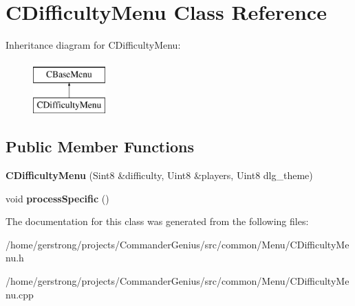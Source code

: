 \hypertarget{class_c_difficulty_menu}{
\section{CDifficultyMenu Class Reference}
\label{class_c_difficulty_menu}
}
Inheritance diagram for CDifficultyMenu:\begin{figure}[H]
\begin{center}
\leavevmode
\includegraphics[height=2cm]{class_c_difficulty_menu}
\end{center}
\end{figure}
\subsection*{Public Member Functions}
\begin{DoxyCompactItemize}
\item 
\hypertarget{class_c_difficulty_menu_ab044c5cf922eccc86edf45caf96ef6bd}{
{\bfseries CDifficultyMenu} (Sint8 \&difficulty, Uint8 \&players, Uint8 dlg\_\-theme)}
\label{class_c_difficulty_menu_ab044c5cf922eccc86edf45caf96ef6bd}

\item 
\hypertarget{class_c_difficulty_menu_a0efa1ae9f215508b0ae8f6dcd527b32c}{
void {\bfseries processSpecific} ()}
\label{class_c_difficulty_menu_a0efa1ae9f215508b0ae8f6dcd527b32c}

\end{DoxyCompactItemize}


The documentation for this class was generated from the following files:\begin{DoxyCompactItemize}
\item 
/home/gerstrong/projects/CommanderGenius/src/common/Menu/CDifficultyMenu.h\item 
/home/gerstrong/projects/CommanderGenius/src/common/Menu/CDifficultyMenu.cpp\end{DoxyCompactItemize}
